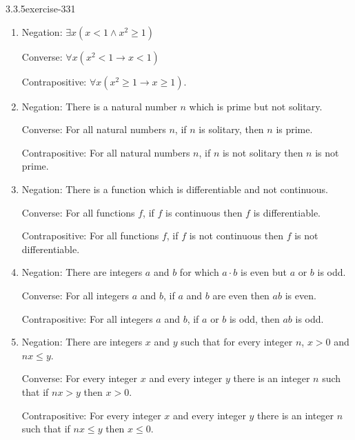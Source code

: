 \documentclass[twoside,11pt,]{book}
\numberwithin{equation}{chapter}
\newcommand{\imp}{\rightarrow}
\newcommand{\lt}{<}
\newcommand{\gt}{>}
\begin{document}
\begin{divisionsolution}{3.3.5}{}{exercise-331}
\begin{enumerate}[label=(\alph*)]
\hypertarget{p-4243}{}%
Converse: If the light is off then the door is closed.%
\par
\hypertarget{p-4244}{}%
Contrapositive: If the light is on then the door is open.%
\item\hypertarget{li-2161}{}\hypertarget{p-4245}{}%
Negation: \(\exists x (x \lt 1 \wedge x^2 \ge 1)\)%
\par
\hypertarget{p-4246}{}%
Converse: \(\forall x( x^2 \lt 1 \imp x \lt 1)\)%
\par
\hypertarget{p-4247}{}%
Contrapositive: \(\forall x (x^2 \ge 1 \imp x \ge 1)\).%
\item\hypertarget{li-2162}{}\hypertarget{p-4248}{}%
Negation: There is a natural number \(n\) which is prime but not solitary.%
\par
\hypertarget{p-4249}{}%
Converse: For all natural numbers \(n\), if \(n\) is solitary, then \(n\) is prime.%
\par
\hypertarget{p-4250}{}%
Contrapositive: For all natural numbers \(n\), if \(n\) is not solitary then \(n\) is not prime.%
\item\hypertarget{li-2163}{}\hypertarget{p-4251}{}%
Negation: There is a function which is differentiable and not continuous.%
\par
\hypertarget{p-4252}{}%
Converse: For all functions \(f\), if \(f\) is continuous then \(f\) is differentiable.%
\par
\hypertarget{p-4253}{}%
Contrapositive: For all functions \(f\), if \(f\) is not continuous then \(f\) is not differentiable.%
\item\hypertarget{li-2164}{}\hypertarget{p-4254}{}%
Negation: There are integers \(a\) and \(b\) for which \(a\cdot b\) is even but \(a\) or \(b\) is odd.%
\par
\hypertarget{p-4255}{}%
Converse: For all integers \(a\) and \(b\), if \(a\) and \(b\) are even then \(ab\) is even.%
\par
\hypertarget{p-4256}{}%
Contrapositive: For all integers \(a\) and \(b\), if \(a\) or \(b\) is odd, then \(ab\) is odd.%
\item\hypertarget{li-2165}{}\hypertarget{p-4257}{}%
Negation: There are integers \(x\) and \(y\) such that for every integer \(n\), \(x \gt 0\) and \(nx \le y\).%
\par
\hypertarget{p-4258}{}%
Converse: For every integer \(x\) and every integer \(y\) there is an integer \(n\) such that if \(nx >
y\) then \(x > 0\).%
\par
\hypertarget{p-4259}{}%
Contrapositive: For every integer \(x\) and every integer \(y\) there is an integer \(n\) such that if \(nx \le y\) then \(x \le 0\).%

\end{enumerate}
\end{divisionsolution}
\end{document}
